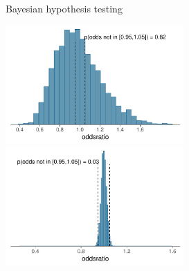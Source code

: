 \documentclass[english,t]{beamer}
\begin{document}
\begin{frame}{Bayesian hypothesis testing}
{\begin{minipage}{14.1cm}
      \hspace{-1.2cm}\includegraphics[width=6.8cm]{odds2_rope.pdf}\includegraphics[width=6.8cm]{odds3_rope.pdf}
    \end{minipage}}
  
\end{frame}
\end{document}
